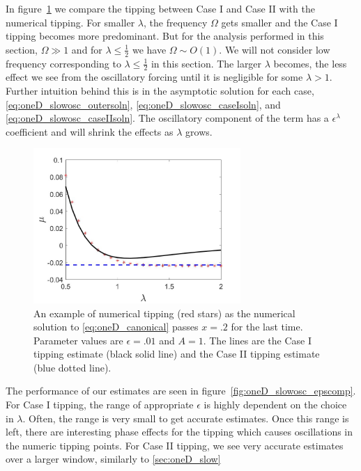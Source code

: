 In figure~\ref{fig:oneD_slowosc_lambdacomp} we compare the tipping between Case I and Case II with the numerical tipping. For smaller $\lambda$, the frequency $\Omega$ gets smaller and the Case I tipping becomes more predominant. But for the analysis performed in this section, $\Omega\gg 1$ and for $\lambda\le\frac{1}{2}$ we have $\Omega\sim O(1)$. We will not consider low frequency corresponding to $\lambda\le\frac{1}{2}$ in this section. The larger $\lambda$ becomes, the less effect we see from the oscillatory forcing until it is negligible for some $\lambda>1$. Further intuition behind this is in the asymptotic solution for each case, \eqref{eq:oneD_slowosc_outersoln}, \eqref{eq:oneD_slowosc_caseIsoln}, and \eqref{eq:oneD_slowosc_caseIIsoln}. The oscillatory component of the term has a $\epsilon^\lambda$ coefficient and will shrink the effects as $\lambda$ grows.

\begin{figure}[H]
\centering
\includegraphics[width=0.7\textwidth]{oneD/slowosc_lambdacomp.jpg}
\caption{An example of numerical tipping (red stars) as the numerical solution to \eqref{eq:oneD_canonical} passes $x=.2$ for the last time. Parameter values are $\epsilon=.01$ and $A=1$. The lines are the Case I tipping estimate (black solid line) and the Case II tipping estimate (blue dotted line).}
\label{fig:oneD_slowosc_lambdacomp}
\end{figure} 

The performance of our estimates are seen in figure~\ref{fig:oneD_slowosc_epscomp}. For Case I tipping, the range of appropriate $\epsilon$ is highly dependent on the choice in $\lambda$. Often, the range is very small to get accurate estimates. Once this range is left, there are interesting phase effects for the tipping which causes oscillations in the numeric tipping points. For Case II tipping, we see very accurate estimates over a larger window, similarly to \autoref{sec:oneD_slow}


